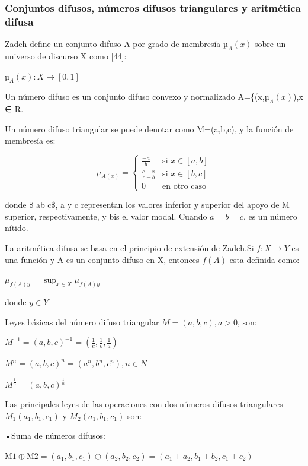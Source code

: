 \documentclass[
]{article}
\begin{document}
\hypertarget{conjuntos-difusos-nuxfameros-difusos-triangulares-y-aritmuxe9tica-difusa}{%
\subsubsection{Conjuntos difusos, números difusos triangulares y
aritmética
difusa}\label{conjuntos-difusos-nuxfameros-difusos-triangulares-y-aritmuxe9tica-difusa}}

Zadeh define un conjunto difuso A por grado de membresía \(µ_{A}(x)\)
sobre un universo de discurso X como {[}44{]}:

\(µ_{A}(x):X \rightarrow [0,1]\)

Un número difuso es un conjunto difuso convexo y normalizado
A=\{(x,\(µ_{A}(x)\)),x ∈ R.

Un número difuso triangular se puede denotar como M=(a,b,c), y la
función de membresía es:

\[
\mu_{A(x)} = \begin{cases}
\frac{-a}{b} & \text{si } x \in [a, b] \\
\frac{c - x}{c - b} & \text{si } x \in [b, c] \\
0 & \text{en otro caso}
\end{cases}
\]

donde \$ a\leq b \leq c\$, a y c representan los valores inferior y
superior del apoyo de M superior, respectivamente, y bis el valor modal.
Cuando \(a=b=c\), es un número nítido.

La aritmética difusa se basa en el principio de extensión de Zadeh.Si
\(f:X \rightarrow Y\) es una función y A es un conjunto difuso en X,
entonces \(f(A)\) esta definida como:

\(\mu_{f(A)y} = \sup_{x \in X} \mu_{f(A)y}\)

donde \(y ∈ Y\)

Leyes básicas del número difuso triangular \(M=(a,b,c), a>0\), son:

\(M^{-1}=(a,b,c)^{-1}=(\frac{1}{c},\frac{1}{b},\frac{1}{a})\)

\(M^n=(a,b,c)^n=(a^n,b^n,c^n), n∈N\)

\(M^{\frac{1}{n}}=(a,b,c)^\frac{1}{n}=\)

Las principales leyes de las operaciones con dos números difusos
triangulares \(M_1(a_1,b_1,c_1)\) y \(M_2(a_1,b_1,c_1)\) son:

•Suma de números difusos:

\(\text{M1} \oplus \text{M2} = (a_1, b_1, c_1) \oplus (a_2, b_2, c_2) = (a_1 + a_2, b_1 + b_2, c_1 + c_2)\)
\end{document}
